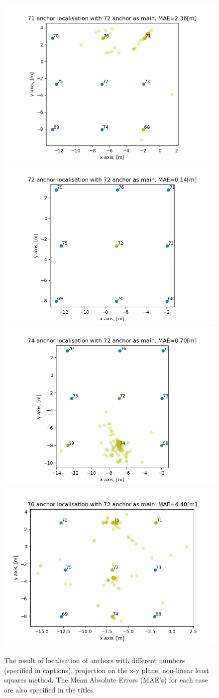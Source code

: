 \documentclass[journal]{IEEEtran}
\begin{document}
\begin{figure}[ht]%
    \centering
    \includegraphics[width=0.49\linewidth, height=0.4\textwidth]{graphics/ress/tdoa_71_72.png}
    \includegraphics[width=0.49\linewidth, height=0.4\textwidth]{graphics/ress/tdoa_72_72.png}
    \includegraphics[width=0.49\linewidth, height=0.4\textwidth]{graphics/ress/tdoa_74_72.png}
    \includegraphics[width=0.49\linewidth, height=0.4\textwidth]{graphics/ress/tdoa_76_72.png}
    \caption{The result of localisation of anchors with different numbers (specified in captions), projection on the x-y plane, non-linear least squares method. The Mean Absolute Errors (MAE's) for each case are also specified in the titles.}
    \label{fig:tdoa_res}
\end{figure}
\end{document}
